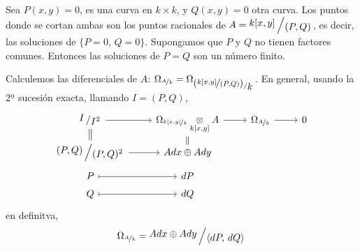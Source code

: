\begin{ejem}
    Sea $P(x,y)=0$, es una curva en $k\times k$, y $Q(x,y)=0$ otra curva. Los puntos donde se cortan ambas son los puntos racionales de $A=\modulo{k[x,y]}{(P,Q)}$, es decir, las soluciones de $\{P=0, \, Q=0\}$. Supongamos que $P$ y $Q$ no tienen factores comunes. Entonces las soluciones de $P=Q$ son un n\'umero finito. 

    Calculemos las diferenciales de $A$: $ \Omega_{\nicefrac{A}{k}}=\Omega_{\modulo{(\nicefrac{k[x,y]}{(P,Q)})}{k}} $. En general, usando la 2ª sucesión exacta, llamando $I=(P,Q)$, 
    $$\bt \modulo{I}{I^2} \rar &  \Omega_{\nicefrac{k[x,y]}{k}} \underset{k[x,y]}{\otimes} A \rar & \Omega_{\nicefrac{A}{k}} \rar & 0 \\[-5mm] \modulo{(P,Q)}{(P,Q)^2} \rar \arrow[equal]{u} & Adx\oplus Ady \arrow[equal]{u} &  \\[-5mm] P \rarmaps & dP \\[-5mm] Q \rarmaps & dQ  \et$$
    en definitva, 
    $$\Omega_{\nicefrac{A}{k}} = \modulo{Adx\oplus Ady}{\langle dP, \, dQ \rangle}$$
\end{ejem}
